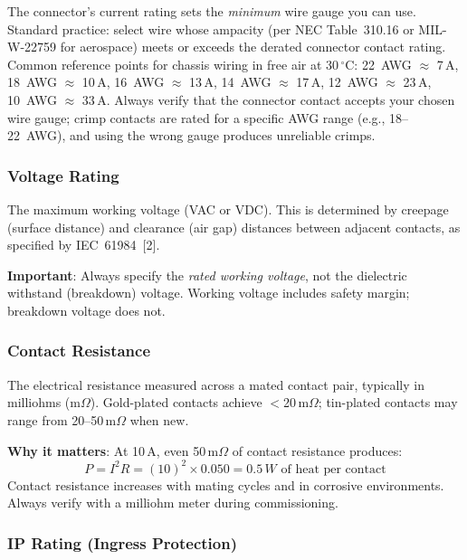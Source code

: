 \documentclass[11pt,letterpaper,twoside,openany]{book}
\newcommand{\degC}{\ensuremath{{}^{\circ}\text{C}}}
\begin{document}
\begin{tipbox}
The connector's current rating sets the \emph{minimum} wire gauge you can use. Standard practice: select wire whose ampacity (per NEC Table~310.16 or MIL-W-22759 for aerospace) meets or exceeds the derated connector contact rating. Common reference points for chassis wiring in free air at 30\,\degC{}: 22~AWG $\approx$ 7\,A, 18~AWG $\approx$ 10\,A, 16~AWG $\approx$ 13\,A, 14~AWG $\approx$ 17\,A, 12~AWG $\approx$ 23\,A, 10~AWG $\approx$ 33\,A. Always verify that the connector contact accepts your chosen wire gauge; crimp contacts are rated for a specific AWG range (e.g., 18--22~AWG), and using the wrong gauge produces unreliable crimps.
\end{tipbox}

\subsubsection{Voltage Rating}

The maximum working voltage (VAC or VDC). This is determined by creepage (surface distance) and clearance (air gap) distances between adjacent contacts, as specified by IEC~61984~[2]. 

\textbf{Important}: Always specify the \emph{rated working voltage}, not the dielectric withstand (breakdown) voltage. Working voltage includes safety margin; breakdown voltage does not.

\subsubsection{Contact Resistance}

The electrical resistance measured across a mated contact pair, typically in milliohms (m$\Omega$). Gold-plated contacts achieve $<$20\,m$\Omega$; tin-plated contacts may range from 20--50\,m$\Omega$ when new.

\textbf{Why it matters}: At 10\,A, even 50\,m$\Omega$ of contact resistance produces:
\begin{equation}
  P = I^2 R = (10)^2 \times 0.050 = 0.5\,W \text{ of heat per contact}
\end{equation}
Contact resistance increases with mating cycles and in corrosive environments. Always verify with a milliohm meter during commissioning.

\subsubsection{IP Rating (Ingress Protection)}
\end{document}
